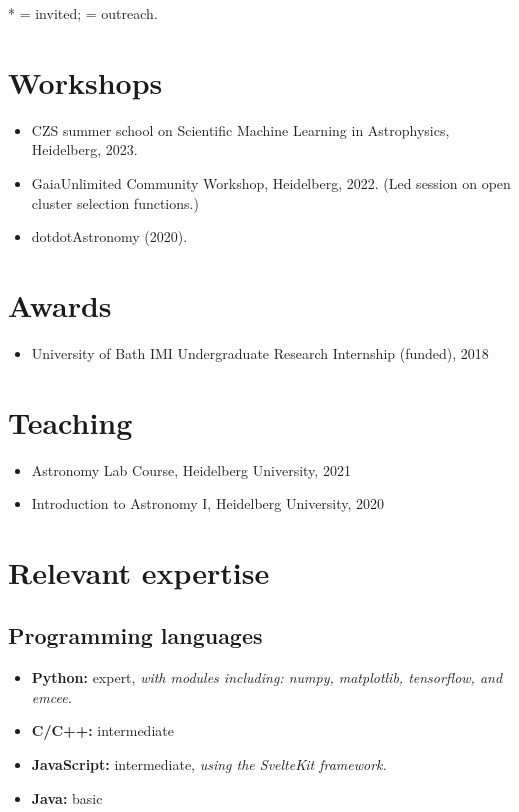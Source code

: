 \documentclass[12pt, letterpaper]{hunt-cv}
\begin{document}
* = invited; \cross = outreach.
\vspace{0.5cm}

\section*{Workshops}

\begin{itemize}
    \item CZS summer school on Scientific Machine Learning in Astrophysics, Heidelberg, 2023.
    \item GaiaUnlimited Community Workshop, Heidelberg, 2022. (Led session on open cluster selection functions.)
    \item dotdotAstronomy (2020).
\end{itemize}


\section*{Awards}

\begin{itemize}
    \item University of Bath IMI Undergraduate Research Internship (funded), 2018
\end{itemize}


\section*{Teaching}

\begin{itemize}
    \item Astronomy Lab Course, Heidelberg University, 2021
    \item Introduction to Astronomy I, Heidelberg University, 2020
\end{itemize}


\section*{Relevant expertise}

\subsection*{Programming languages}

\begin{itemize}
    \item \textbf{Python:} expert, \emph{with modules including: numpy, matplotlib, tensorflow, and emcee.}
    \item \textbf{C/C++:} intermediate
    \item \textbf{JavaScript:} intermediate, \emph{using the SvelteKit framework.}
    \item \textbf{Java:} basic
\end{itemize}
\end{document}
